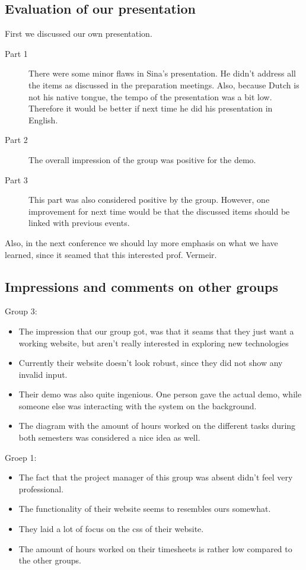\documentclass[a4paper, 12pt]{article}
\begin{document}
		\subsection{Evaluation of our presentation}
			First we discussed our own presentation.
			\begin{description}
				\item[Part 1] There were some minor flaws in Sina's presentation. He didn't address all the items as discussed in the preparation meetings. Also, because Dutch is not his native tongue, the tempo of the presentation was a bit low. Therefore it would be better if next time he did his presentation in English.
				\item[Part 2] The overall impression of the group was positive for the demo.
				\item[Part 3] This part was also considered positive by the group. However, one improvement for next time would be that the discussed items should be linked with previous events.
			\end{description}
			Also, in the next conference we should lay more emphasis on what we have learned, since it seamed that this interested prof. Vermeir.

		\subsection{Impressions and comments on other groups}
		Group 3:
		\begin{itemize}
			\item The impression that our group got, was that it seams that they just want a working website, but aren't really interested in exploring new technologies
			\item Currently their website doesn't look robust, since they did not show any invalid input.
			\item Their demo was also quite ingenious. One person gave the actual demo, while someone else was interacting with the system on the background.
			\item The diagram with the amount of hours worked on the different tasks during both semesters was considered a nice idea as well.
		\end{itemize}
		Groep 1:
		\begin{itemize}
			\item The fact that the project manager of this group was absent didn't feel very professional. 
			\item The functionality of their website seems to resembles ours somewhat.
			\item They laid a lot of focus on the css of their website.
			\item The amount of hours worked on their timesheets is rather low compared to the other groups.
		\end{itemize}
\end{document}

